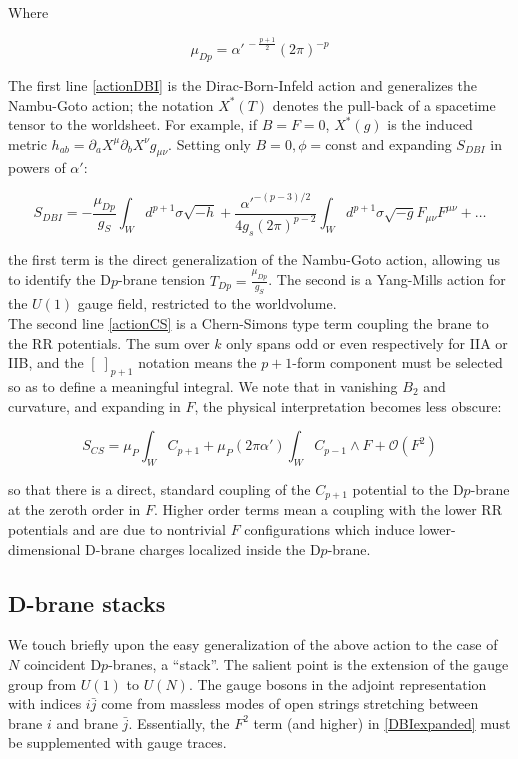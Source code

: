 Where 

\begin{equation}
	\mu_{Dp} = \alpha'^{\,-\frac{p+1}2}(2\pi)^{-p}
	\label{}
\end{equation}

The first line \ref{actionDBI} is the Dirac-Born-Infeld action and generalizes the Nambu-Goto action; the notation $X^*(T)$ denotes the pull-back of a spacetime tensor to the worldsheet. For example, if $B = F = 0$, $X^*(g)$ is the induced metric $h_{ab} = \partial_a X^\mu \partial_b X^\nu g_{\mu\nu}$. Setting only $B=0, \phi = \mathrm{const}$ and expanding $S_{DBI}$ in powers of $\alpha'$:

\begin{equation}
	S_{DBI} = -\frac{\mu_{Dp}}{g_S} \int_W d^{p+1} \sigma \sqrt{-h} + \frac{\alpha'^{-(p-3)/2}}{4 g_s (2\pi)^{p-2} } \int_W d^{p+1} \sigma \sqrt{-g} F_{\mu\nu} F^{\mu\nu} + \dots
	\label{DBIexpanded}
\end{equation}

the first term is the direct generalization of the Nambu-Goto action, allowing us to identify the D$p$-brane tension $T_{Dp} = \frac{\mu_{Dp}}{g_S}$. The second is a Yang-Mills action for the $U(1)$ gauge field, restricted to the worldvolume.\\

The second line \ref{actionCS} is a Chern-Simons type term coupling the brane to the RR potentials. The sum over $k$ only spans odd or even respectively for IIA or IIB, and the $\left[ \; \right]_{p+1}$ notation means the $p+1$-form component must be selected so as to define a meaningful integral. We note that in vanishing $B_2$ and curvature, and expanding in $F$, the physical interpretation becomes less obscure:

\begin{equation}
	S_{CS} = \mu_P \int_W C_{p+1} + \mu_P(2\pi\alpha') \int_W C_{p-1} \wedge F + \mathcal{O}(F^2)\label{} \end{equation}

so that there is a direct, standard coupling of the $C_{p+1}$ potential to the D$p$-brane at the zeroth order in $F$. Higher order terms mean a coupling with the lower RR potentials and are due to nontrivial $F$ configurations which induce lower-dimensional D-brane charges localized inside the D$p$-brane.

\subsection{D-brane stacks}

\label{sec:branestacks}

We touch briefly upon the easy generalization of the above action to the case of $N$ coincident D$p$-branes, a ``stack''. The salient point is the extension of the gauge group from $U(1)$ to $U(N)$. The gauge bosons in the adjoint representation with indices $i\bar j$ come from massless modes of open strings stretching between brane $i$ and brane $\bar j$. Essentially, the $F^2$ term (and higher) in \ref{DBIexpanded} must be supplemented with gauge traces.


